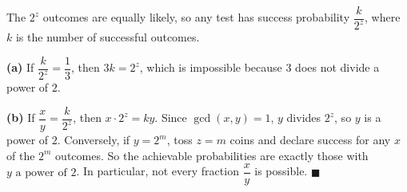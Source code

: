 The $2^z$ outcomes are equally likely, so any test has success probability $\dfrac{k}{2^z}$, where $k$ is the number of successful outcomes.

\textbf{(a)} If $\dfrac{k}{2^z}=\dfrac13$, then $3k=2^z$, which is impossible because $3$ does not divide a power of $2$.

\textbf{(b)} If $\dfrac xy=\dfrac{k}{2^z}$, then $x\cdot2^z=ky$. Since $\gcd(x,y)=1$, $y$ divides $2^z$, so $y$ is a power of $2$. Conversely, if $y=2^m$, toss $z=m$ coins and declare success for any $x$ of the $2^m$ outcomes. So the achievable probabilities are exactly those with $\boxed{y\text{ a power of }2}$. In particular, not every fraction $\dfrac xy$ is possible. $\blacksquare$
